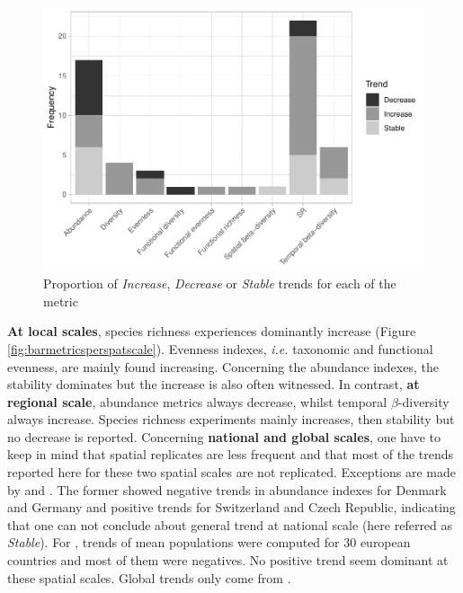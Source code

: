 \documentclass[
  12pt,
  oneside]{report}
\begin{document}
\begin{figure}
\centering
\includegraphics{literature_review_files/figure-latex/barmetrics-1.pdf}
\caption{\label{fig:barmetrics}Proportion of \emph{Increase}, \emph{Decrease} or \emph{Stable} trends for each of the metric}
\end{figure}

\textbf{At local scales}, species richness experiences dominantly increase (Figure \ref{fig:barmetricsperspatscale}). Evenness indexes, \emph{i.e.} taxonomic and functional evenness, are mainly found increasing. Concerning the abundance indexes, the stability dominates but the increase is also often witnessed. In contrast, \textbf{at regional scale}, abundance metrics always decrease, whilst temporal \(\beta\)-diversity always increase. Species richness experiments mainly increases, then stability but no decrease is reported. Concerning \textbf{national and global scales}, one have to keep in mind that spatial replicates are less frequent and that most of the trends reported here for these two spatial scales are not replicated. Exceptions are made by \textcite{bowler_geographic_2021} and \textcite{donald_agricultural_2001}. The former showed negative trends in abundance indexes for Denmark and Germany and positive trends for Switzerland and Czech Republic, indicating that one can not conclude about general trend at national scale (here referred as \emph{Stable}). For \textcite{donald_agricultural_2001}, trends of mean populations were computed for 30 european countries and most of them were negatives. No positive trend seem dominant at these spatial scales. Global trends only come from \textcite{jarzyna_taxonomic_2018}.
\end{document}

